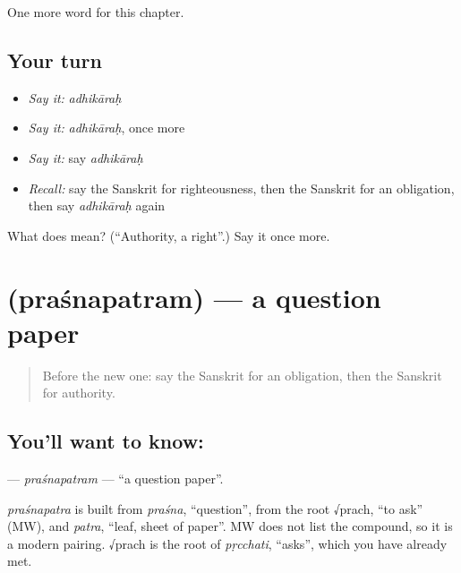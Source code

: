 \begin{grammarlens}[title={What you've built}]
One more word for this chapter.
\end{grammarlens}

\subsection*{Your turn}
\begin{itemize}
\raggedright
  \item \emph{Say it:} \emph{adhikāraḥ}
  \item \emph{Say it:} \emph{adhikāraḥ}, once more
  \item \emph{Say it:} say \emph{adhikāraḥ}
  \item \emph{Recall:} say the Sanskrit for righteousness, then the Sanskrit for an obligation, then say \emph{adhikāraḥ} again
\end{itemize}

\begin{tcolorbox}[breakable,colback=teal!4,colframe=teal!35!black,title={Before you move on}]
What does  mean? (\textquotedblleft{}Authority, a right\textquotedblright{}.) Say it once more.
\end{tcolorbox}
\section[\texorpdfstring{\sk{प्रश्नपत्रम्} (praśnapatram)}{प्रश्नपत्रम् (praśnapatram)}]{ (praśnapatram) — a question paper}

\label{lesson:SA-C229-prasnapatram}



\begin{quote}
Before the new one: say the Sanskrit for an obligation, then the Sanskrit for authority.
\end{quote}

\subsection*{You'll want to know: }
\textbf{} — \emph{praśnapatram} — \textquotedblleft{}a question paper\textquotedblright{}.

\begin{cousinweb}
\emph{praśnapatra} is built from \emph{praśna}, \textquotedblleft{}question\textquotedblright{}, from the root √prach, \textquotedblleft{}to ask\textquotedblright{} (MW), and \emph{patra}, \textquotedblleft{}leaf, sheet of paper\textquotedblright{}. MW does not list the compound, so it is a modern pairing. √prach is the root of \emph{pṛcchati}, \textquotedblleft{}asks\textquotedblright{}, which you have already met.
\end{cousinweb}

